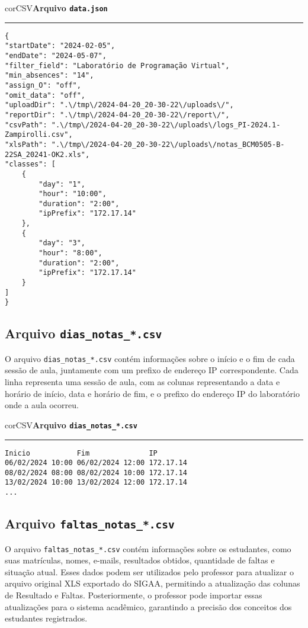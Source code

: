 \begin{myboxCode}{corCSV}{\textbf{Arquivo \texttt{data.json}}}\vspace{3mm}
\hrule
\begin{verbatim}
{
"startDate": "2024-02-05",
"endDate": "2024-05-07",
"filter_field": "Laboratório de Programação Virtual",
"min_absences": "14",
"assign_O": "off",
"omit_data": "off",
"uploadDir": ".\/tmp\/2024-04-20_20-30-22\/uploads\/",
"reportDir": ".\/tmp\/2024-04-20_20-30-22\/report\/",
"csvPath": ".\/tmp\/2024-04-20_20-30-22\/uploads\/logs_PI-2024.1-Zampirolli.csv",
"xlsPath": ".\/tmp\/2024-04-20_20-30-22\/uploads\/notas_BCM0505-B-22SA_20241-OK2.xls",
"classes": [
    {
        "day": "1",
        "hour": "10:00",
        "duration": "2:00",
        "ipPrefix": "172.17.14"
    },
    {
        "day": "3",
        "hour": "8:00",
        "duration": "2:00",
        "ipPrefix": "172.17.14"
    }
]
}
\end{verbatim}
\end{myboxCode}

\subsection{Arquivo \texttt{dias\_notas\_*.csv}}

O arquivo \texttt{dias\_notas\_*.csv} contém informações sobre o início e o fim de cada sessão de aula, juntamente com um prefixo de endereço IP correspondente. Cada linha representa uma sessão de aula, com as colunas representando a data e horário de início, data e horário de fim, e o prefixo do endereço IP do laboratório onde a aula ocorreu.

\begin{myboxCode}{corCSV}{\textbf{Arquivo \texttt{dias\_notas\_*.csv}}}\vspace{3mm}
    \hrule
    \begin{verbatim}
Inicio           Fim              IP
06/02/2024 10:00 06/02/2024 12:00 172.17.14
08/02/2024 08:00 08/02/2024 10:00 172.17.14
13/02/2024 10:00 13/02/2024 12:00 172.17.14
...
\end{verbatim}
\end{myboxCode}

\subsection{Arquivo \texttt{faltas\_notas\_*.csv}}

O arquivo \texttt{faltas\_notas\_*.csv} contém informações sobre os estudantes, como suas matrículas, nomes, e-mails, resultados obtidos, quantidade de faltas e situação atual. Esses dados podem ser utilizados pelo professor para atualizar o arquivo original XLS exportado do SIGAA, permitindo a atualização das colunas de Resultado e Faltas. Posteriormente, o professor pode importar essas atualizações para o sistema acadêmico, garantindo a precisão dos conceitos dos estudantes registrados.


